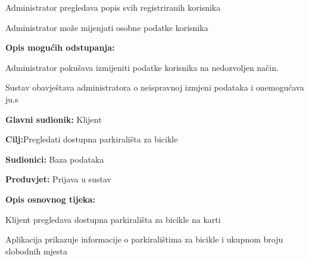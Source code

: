 {\begin{packed_item}
	\item[] \begin{packed_enum}
		
		\item Administrator pregledava popis svih registriranih korisnika
		\item Administrator može mijenjati osobne podatke korisnika
		
	\end{packed_enum}
	
	\item  \textbf{Opis mogućih odstupanja:}
	
	\item[] \begin{packed_item}
		
		\item[2.a] Administrator pokušava izmijeniti podatke korisnika na nedozvoljen način.
		\item[] \begin{packed_enum}
			
			\item Sustav obavještava administratora o neispravnoj izmjeni podataka i onemogućava ju.s
			
		\end{packed_enum}
		
	\end{packed_item}
	
\end{packed_item}

\noindent {}
\begin{packed_item}
	
	\item \textbf{Glavni sudionik: }Klijent
	\item  \textbf{Cilj:}Pregledati dostupna parkirališta za bicikle
	\item  \textbf{Sudionici:} Baza podataka
	\item  \textbf{Preduvjet:} Prijava u sustav
	\item  \textbf{Opis osnovnog tijeka:}
	
	\item[] \begin{packed_enum}
		
		\item Klijent pregledava dostupna parkirališta za bicikle na karti
		\item Aplikacija prikazuje informacije o parkiralištima za bicikle i ukupnom broju slobodnih mjesta
		

\end{packed_enum}
\end{packed_item}}
